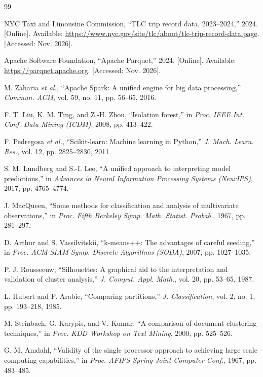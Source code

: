 \documentclass[11pt,a4paper]{article}
\begin{document}
\begin{thebibliography}{99}
\footnotesize
\setlength{\itemsep}{0pt}

NYC Taxi and Limousine Commission, ``TLC trip record data, 2023--2024,'' 2024. [Online]. Available: \url{https://www.nyc.gov/site/tlc/about/tlc-trip-record-data.page}. [Accessed: Nov. 2026].

Apache Software Foundation, ``Apache Parquet,'' 2024. [Online]. Available: \url{https://parquet.apache.org}. [Accessed: Nov. 2026].

M. Zaharia \emph{et al.}, ``Apache Spark: A unified engine for big data processing,'' \emph{Commun. ACM}, vol. 59, no. 11, pp. 56--65, 2016.

F. T. Liu, K. M. Ting, and Z.-H. Zhou, ``Isolation forest,'' in \emph{Proc. IEEE Int. Conf. Data Mining (ICDM)}, 2008, pp. 413--422.

F. Pedregosa \emph{et al.}, ``Scikit-learn: Machine learning in Python,'' \emph{J. Mach. Learn. Res.}, vol. 12, pp. 2825--2830, 2011.

S. M. Lundberg and S.-I. Lee, ``A unified approach to interpreting model predictions,'' in \emph{Advances in Neural Information Processing Systems (NeurIPS)}, 2017, pp. 4765--4774.

J. MacQueen, ``Some methods for classification and analysis of multivariate observations,'' in \emph{Proc. Fifth Berkeley Symp. Math. Statist. Probab.}, 1967, pp. 281--297.

D. Arthur and S. Vassilvitskii, ``k-means++: The advantages of careful seeding,'' in \emph{Proc. ACM-SIAM Symp. Discrete Algorithms (SODA)}, 2007, pp. 1027--1035.

P. J. Rousseeuw, ``Silhouettes: A graphical aid to the interpretation and validation of cluster analysis,'' \emph{J. Comput. Appl. Math.}, vol. 20, pp. 53--65, 1987.

L. Hubert and P. Arabie, ``Comparing partitions,'' \emph{J. Classification}, vol. 2, no. 1, pp. 193--218, 1985.

M. Steinbach, G. Karypis, and V. Kumar, ``A comparison of document clustering techniques,'' in \emph{Proc. KDD Workshop on Text Mining}, 2000, pp. 525--526.

G. M. Amdahl, ``Validity of the single processor approach to achieving large scale computing capabilities,'' in \emph{Proc. AFIPS Spring Joint Computer Conf.}, 1967, pp. 483--485.


\end{thebibliography}
\end{document}
